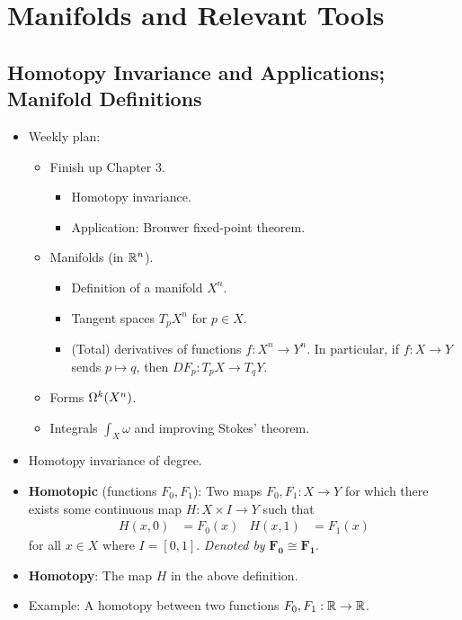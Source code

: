 \documentclass[../notes.tex]{subfiles}
\begin{document}
\chapter{Manifolds and Relevant Tools}
\section{Homotopy Invariance and Applications; Manifold Definitions}
\begin{itemize}
    \item {}Weekly plan:
    \begin{itemize}
        \item Finish up Chapter 3.
        \begin{itemize}
            \item Homotopy invariance.
            \item Application: Brouwer fixed-point theorem.
        \end{itemize}
        \item Manifolds (in $\R^n$).
        \begin{itemize}
            \item Definition of a manifold $X^n$.
            \item Tangent spaces $T_pX^n$ for $p\in X$.
            \item (Total) derivatives of functions $f:X^n\to Y^n$. In particular, if $f:X\to Y$ sends $p\mapsto q$, then $DF_p:T_pX\to T_qY$.
        \end{itemize}
        \item Forms $\ome[k]{X^n}$.
        \item Integrals $\int_X\omega$ and improving Stokes' theorem.
    \end{itemize}
    \item Homotopy invariance of degree.
    \item \textbf{Homotopic} (functions $F_0,F_1$): Two maps $F_0,F_1:X\to Y$ for which there exists some continuous map $H:X\times I\to Y$ such that
    \begin{align*}
        H(x,0) &= F_0(x)&
        H(x,1) &= F_1(x)
    \end{align*}
    for all $x\in X$ where $I=[0,1]$. \emph{Denoted by} $\bm{F_0\cong F_1}$.
    \item \textbf{Homotopy}: The map $H$ in the above definition.
    \item Example: A homotopy between two functions $F_0,F_1:\R\to\R$.
    \begin{figure}[h!]
        \centering
        \footnotesize
\end{figure}
\end{itemize}
\end{document}
